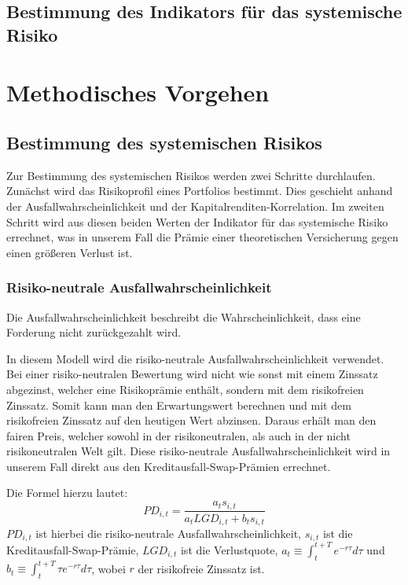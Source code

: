 \documentclass[a4paper,12pt]{scrartcl}
\begin{document}
\subsection{Bestimmung des Indikators für das systemische Risiko}


\section{Methodisches Vorgehen}
\subsection{Bestimmung des systemischen Risikos}
Zur Bestimmung des systemischen Risikos werden zwei Schritte durchlaufen. Zunächst wird das Risikoprofil eines Portfolios bestimmt. Dies geschieht anhand der Ausfallwahrscheinlichkeit und der Kapitalrenditen-Korrelation.
Im zweiten Schritt wird aus diesen beiden Werten der Indikator für das systemische Risiko errechnet, was in unserem Fall die Prämie einer theoretischen Versicherung gegen einen größeren Verlust ist.
\subsubsection{Risiko-neutrale Ausfallwahrscheinlichkeit}
Die Ausfallwahrscheinlichkeit beschreibt die Wahrscheinlichkeit, dass eine Forderung nicht zurückgezahlt wird.

In diesem Modell wird die risiko-neutrale Ausfallwahrscheinlichkeit verwendet. Bei einer risiko-neutralen Bewertung wird nicht wie sonst mit einem Zinssatz abgezinst, welcher eine Risikoprämie enthält, sondern mit dem risikofreien Zinssatz. Somit kann man den Erwartungswert berechnen und mit dem risikofreien Zinssatz auf den heutigen Wert abzinsen. Daraus erhält man den fairen Preis, welcher sowohl in der risikoneutralen, als auch in der nicht risikoneutralen Welt gilt.
Diese risiko-neutrale Ausfallwahrscheinlichkeit wird in unserem Fall direkt aus den Kreditausfall-Swap-Prämien errechnet. 

Die Formel hierzu lautet: 
\begin{equation}
PD_{i,t}=\frac{a_t s_{i,t}}{a_t LGD_{i,t}+b_t s_{i,t}}
\end{equation}
$PD_{i,t}$ ist hierbei die risiko-neutrale Ausfallwahrscheinlichkeit, $s_{i,t}$ ist die Kreditausfall-Swap-Prämie, $LGD_{i,t}$ ist die Verlustquote, $a_t \equiv \int_{t}^{t+T} e^{-r \tau}d \tau$ und $b_t \equiv \int_{t}^{t+T} \tau e^{-r \tau}d \tau$, wobei $r$ der risikofreie Zinssatz ist.
\end{document}

